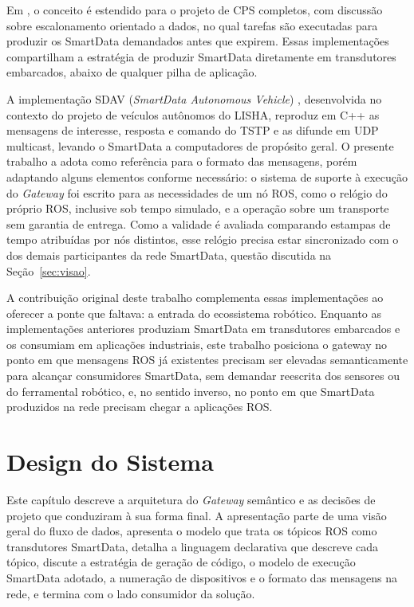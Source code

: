 \documentclass[
    12pt,
    oneside,
    a4paper,
    chapter=TITLE,
    section=TITLE,
    english,
    brazil
]{abntex2}
\begin{document}
Em , o conceito é estendido para o
projeto de CPS completos, com discussão sobre escalonamento orientado a
dados, no qual tarefas são executadas para produzir os SmartData
demandados antes que expirem. Essas implementações compartilham a
estratégia de produzir SmartData diretamente em transdutores embarcados,
abaixo de qualquer pilha de aplicação.

A implementação SDAV (\textit{SmartData Autonomous Vehicle})
\cite{lisha2026sdav}, desenvolvida
no contexto do projeto de veículos autônomos do LISHA, reproduz em
C++ as mensagens de interesse, resposta e comando do TSTP e as difunde em
UDP multicast, levando o SmartData a computadores de propósito geral. O
presente trabalho a adota como referência para o formato das mensagens, porém
adaptando alguns elementos conforme necessário: o sistema de suporte à execução do
\textit{Gateway} foi escrito para as necessidades de um nó ROS, como o
relógio do próprio ROS, inclusive sob tempo simulado, e a operação sobre
um transporte sem garantia de entrega. Como a validade é avaliada
comparando estampas de tempo atribuídas por nós distintos, esse relógio
precisa estar sincronizado com o dos demais participantes da rede
SmartData, questão discutida na Seção~\ref{sec:visao}.

A contribuição original deste trabalho complementa essas implementações
ao oferecer a ponte que faltava: a entrada do ecossistema robótico.
Enquanto as implementações anteriores produziam SmartData em transdutores
embarcados e os consumiam em aplicações industriais, este trabalho
posiciona o gateway no ponto em que mensagens ROS já existentes precisam
ser elevadas semanticamente para alcançar consumidores SmartData, sem
demandar reescrita dos sensores ou do ferramental robótico, e, no sentido
inverso, no ponto em que SmartData produzidos na rede precisam chegar a
aplicações ROS.

\chapter{Design do Sistema}
\label{cap:design}

Este capítulo descreve a arquitetura do \textit{Gateway} semântico e as
decisões de projeto que conduziram à sua forma final. A apresentação parte
de uma visão geral do fluxo de dados, apresenta o modelo que trata os
tópicos ROS como transdutores SmartData, detalha a linguagem declarativa
que descreve cada tópico, discute a estratégia de geração de código, o
modelo de execução SmartData adotado, a numeração de dispositivos e o formato das
mensagens na rede, e termina com o lado consumidor da solução.
\end{document}
